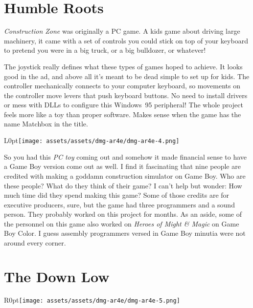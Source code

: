 \documentclass{book}
\begin{document}
\FloatBarrier\section*{Humble Roots}
\emph{Construction Zone} was originally a PC game. A kids game about driving large machinery, it came with a set of controls you could stick on top of your keyboard to pretend you were in a big truck, or a big bulldozer, or whatever!\par
\FloatBarrier\vspace{\baselineskip}\begin{figure}[H]\end{figure}
The joystick really defines what these types of games hoped to achieve. It looks good in the ad, and above all it’s meant to be dead simple to set up for kids. The controller mechanically connects to your computer keyboard, so movements on the controller move levers that push keyboard buttons. No need to install drivers or mess with DLLs to configure this Windows~95 peripheral! The whole project feels more like a toy than proper software. Makes sense when the game has the name Matchbox in the title.\par
\begin{wrapfigure}{L}{0pt}{\texttt{[image: assets/assets/dmg-ar4e/dmg-ar4e-4.png]}}\end{wrapfigure}\noindent
So you had this \emph{PC toy} coming out and somehow it made financial sense to have a Game Boy version come out as well. I find it fascinating that nine people are credited with making a goddamn construction simulator on Game Boy. Who are these people? What do they think of their game? I can’t help but wonder: How much time did they spend making this game? Some of those credits are for executive producers, sure, but the game had three programmers and a sound person. They probably worked on this project for months. As an aside, some of the personnel on this game also worked on \emph{Heroes of Might \& Magic} on Game Boy Color. I guess assembly programmers versed in Game Boy minutia were not around every corner.\par
\FloatBarrier\section*{The Down Low}
\begin{wrapfigure}{R}{0pt}{\texttt{[image: assets/assets/dmg-ar4e/dmg-ar4e-5.png]}}\end{wrapfigure}
\end{document}
